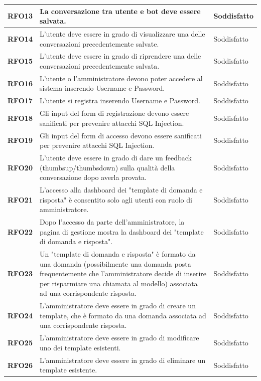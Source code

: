 \begin{longtable}{|>{\centering\arraybackslash}m{}|>{\centering\arraybackslash}m{}|>{\centering\arraybackslash}m{}|}
    \hline
    \textbf{RFO13} & La conversazione tra utente e bot deve essere salvata. & Soddisfatto \\
    \hline
    \textbf{RFO14} & L'utente deve essere in grado di visualizzare una delle conversazioni precedentemente salvate. & Soddisfatto \\
    \hline
    \textbf{RFO15} & L'utente deve essere in grado di riprendere una delle conversazioni precedentemente salvata. & Soddisfatto \\
    \hline
    \textbf{RFO16} & L'utente o l'amministratore devono poter accedere al sistema inserendo Username e Password. & Soddisfatto \\
    \hline
    \textbf{RFO17} & L'utente si registra inserendo Username e Password. & Soddisfatto \\
    \hline
    \textbf{RFO18} & Gli input del form di registrazione devono essere sanificati per prevenire attacchi SQL Injection. & Soddisfatto \\
    \hline
    \textbf{RFO19} & Gli input del form di accesso devono essere sanificati per prevenire attacchi SQL Injection. & Soddisfatto \\
    \hline
    \textbf{RFO20} & L'utente deve essere in grado di dare un feedback (thumbsup/thumbsdown) sulla qualità della conversazione dopo averla provata. & Soddisfatto \\
    \hline
    \textbf{RFO21} & L’accesso alla dashboard dei "template di domanda e risposta" è consentito solo agli utenti con ruolo di amministratore. & Soddisfatto \\
    \hline
    \textbf{RFO22} & Dopo l’accesso da parte dell'amministratore, la pagina di gestione mostra la dashboard dei "template di domanda e risposta". & Soddisfatto \\
    \hline
    \textbf{RFO23} & Un "template di domanda e risposta" è formato da una domanda (possibilmente una domanda posta frequentemente che l'amministratore decide di inserire per risparmiare una chiamata al modello) associata ad una corrispondente risposta. & Soddisfatto \\
    \hline
    \textbf{RFO24} & L'amministratore deve essere in grado di creare un template, che è formato da una domanda associata ad una corrispondente risposta. & Soddisfatto \\
    \hline
    \textbf{RFO25} & L'amministratore deve essere in grado di modificare uno dei template esistenti. & Soddisfatto \\
    \hline
    \textbf{RFO26} & L'amministratore deve essere in grado di eliminare un template esistente. & Soddisfatto \\

\end{longtable}

